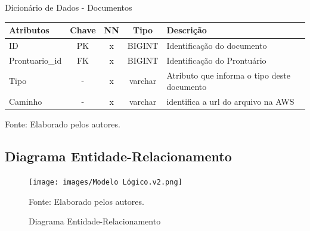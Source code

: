 \documentclass[
    12pt,               %
    openright,          %
    oneside,
    a4paper,            %
    BIBLATEX,           %
    TODO,               %
    english,            %
    brazil              %
    ]{ifsp-spo-inf-ctds}
\begin{document}
                    \begin{center}
                        \begin{quadro}[H]
                        \centering
                            \caption{Dicionário de Dados - Documentos}
                            \begin{tabulary}{1.0\textwidth}{|p{9em}|c|c|c|p{19em}|}
                          \hline
                          Atributos & Chave & NN & Tipo & Descrição\\
                          \hline
                          ID & PK & x & BIGINT & Identificação do documento \\
                          \hline
                          Prontuario\_id & FK & x & BIGINT & Identificação do Prontuário \\
                          \hline
                          Tipo & - & x & varchar & Atributo que informa o tipo deste documento \\
                          \hline
                          Caminho & - & x & varchar & identifica a url do arquivo na AWS\\
                          \hline
                          \end{tabulary}
                           
                            \label{qd: md-documento}
                            \centering
                          {\footnotesize Fonte: Elaborado pelos autores.}
                        \end{quadro}
                      \end{center} 


        \subsection{Diagrama Entidade-Relacionamento}
        
            \begin{figure}[H]
                \centering
                \caption{Diagrama Entidade-Relacionamento}
                \texttt{[image: images/Modelo Lógico.v2.png]}
                
                \label{fig:DER2}
                \centering
        {\footnotesize Fonte: Elaborado pelos autores.}
            \end{figure}




\end{document}
